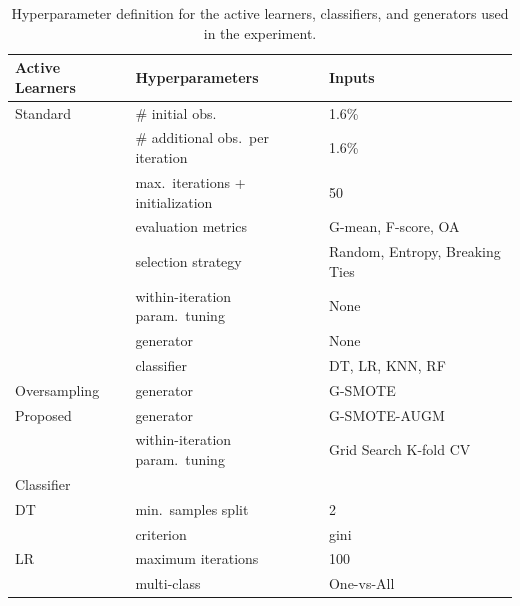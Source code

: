 \begin{table}
	\centering
    \caption{\label{tab:grid}
        Hyperparameter definition for the active learners, classifiers,
        and generators used in the experiment.
    }
	\begin{tabular}{lll}
		\toprule
		Active Learners & Hyperparameters                   & Inputs                         \\
		\midrule
		Standard        & \# initial obs.\                  & 1.6\%                          \\
                        & \# additional obs.\ per iteration & 1.6\%                          \\
                        & max.\ iterations + initialization & 50                             \\
                        & evaluation metrics                & G-mean, F-score, OA            \\
                        & selection strategy                & Random, Entropy, Breaking Ties \\
                        & within-iteration param.\ tuning   & None                           \\
                        & generator                         & None                           \\
                        & classifier                        & DT, LR, KNN, RF                \\
        Oversampling    & generator                         & G-SMOTE                        \\
        Proposed        & generator                         & G-SMOTE-AUGM                   \\
                        & within-iteration param.\ tuning   & Grid Search K-fold CV          \\
		\toprule
		Classifier      &                                  &                                \\
		\midrule
        DT              & min.\ samples split              & 2                              \\
                        & criterion                        & gini                           \\
		LR              & maximum iterations               & 100                            \\
                        & multi-class                      & One-vs-All                     \\

\end{tabular}
\end{table}

